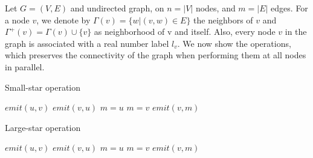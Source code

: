 Let $G = (V,E)$ and undirected graph, on $n = |V|$ nodes, and $m = |E|$ edges. For a node $v$, we denote by $\Gamma(v) = \{w|(v,w) \in E\}$ the neighbors of $v$ and $\Gamma^{+}(v) = \Gamma(v) \cup \{v\}$ as neighborhood of v and itself. Also, every node $v$ in the graph is associated with a real number label $l_{v}$. We now show the operations, which preserves the connectivity of the graph when performing them at all nodes in parallel.

\begin{algorithm}[!h]
        \caption{Small-star operation}
        \label{algo:small_star}
        \begin{algorithmic}[1]
                                \State $emit(u, v)$  
                        \Else
                                \State $emit(v, u)$  
                        \EndIf
                \EndFunction
                        \State $m = u$
                                        \State $m = v$
                                \EndIf
			\EndFor
                                \State $emit(v, m)$
                        \EndFor
                \EndFunction
        \end{algorithmic}
\end{algorithm}


\begin{algorithm}[!h]
        \caption{Large-star operation}
        \label{algo:large_star}
        \begin{algorithmic}[1]
                        \State $emit(u, v)$
                        \State $emit(v, u)$
                \EndFunction
                        \State $m = u$
                                        \State $m = v$
                                \EndIf
                        \EndFor
                                        \State $emit(v, m)$
                                \EndIf
                        \EndFor
                \EndFunction
        \end{algorithmic}
\end{algorithm}

